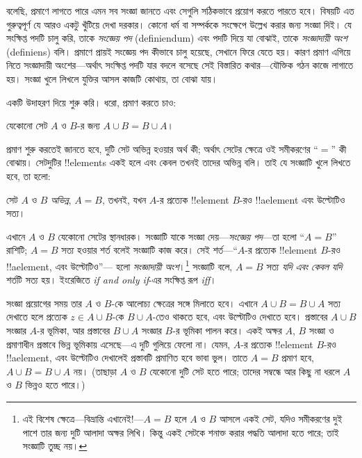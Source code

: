 \documentclass[../../../include/open-logic-section]{subfiles}
\begin{document}


বলেছি, প্রমাণে লাগতে পারে এমন সব সংজ্ঞা জানতে এবং সেগুলি
সঠিকভাবে প্রয়োগ করতে পারতে হবে। বিষয়টি এত গুরুত্বপূর্ণ যে
আরও একটু খুঁটিয়ে দেখা দরকার। কোনো ধর্ম বা সম্পর্ককে সংক্ষেপে
উল্লেখ করার জন্য সংজ্ঞা দিই। যে সংক্ষিপ্ত পদটি চালু করি,
তাকে \emph{সংজ্ঞেয় পদ} (definiendum) এবং পদটি দিয়ে যা বোঝাই,
তাকে \emph{সংজ্ঞাদায়ী অংশ} (definiens) বলি। প্রমাণে প্রায়ই
সংজ্ঞেয় পদ কীভাবে চালু হয়েছে, সেখানে ফিরে যেতে হয়। কারণ
প্রমাণ এগিয়ে নিতে সংজ্ঞাদায়ী অংশের—অর্থাৎ সংক্ষিপ্ত পদটি
যার বদলে বসেছে সেই বিস্তারিত কথার—যৌক্তিক গঠন কাজে
লাগাতে হয়। সংজ্ঞা খুলে লিখলে যুক্তির আসল কাজটি কোথায়,
তা বোঝা যায়।

একটি উদাহরণ দিয়ে শুরু করি। ধরো, প্রমাণ করতে চাও:

\begin{prop}
যেকোনো সেট $A$ ও $B$-র জন্য $A \cup B = B \cup A$।
\end{prop}

প্রমাণ শুরু করতেই জানতে হবে, দুটি সেট অভিন্ন হওয়ার অর্থ
কী; অর্থাৎ সেটের ক্ষেত্রে ওই সমীকরণের ``$=$'' কী বোঝায়।
সেটদুটির !!{element}s একই হলে এবং কেবল তখনই তাদের অভিন্ন
বলি। তাই যে সংজ্ঞাটি খুলে লিখতে হবে, তা হলো:

\begin{defn}
সেট $A$ ও $B$ \emph{অভিন্ন}, $A = B$, তখনই, যখন
$A$-র প্রত্যেক !!{element} $B$-রও !!a{element}
এবং উল্টোটিও সত্য।
\end{defn}

এখানে $A$ ও $B$ যেকোনো সেটের স্থানধারক। সংজ্ঞাটি
যাকে সংজ্ঞা দেয়—\emph{সংজ্ঞেয় পদ}—তা হলো
``$A = B$'' রাশিটি; $A = B$ সত্য হওয়ার শর্ত বলেই
সংজ্ঞাটি কাজ করে। সেই শর্ত—``$A$-র প্রত্যেক
!!{element} $B$-রও !!a{element}, এবং উল্টোটিও''—
হলো \emph{সংজ্ঞাদায়ী অংশ}।\footnote{এই বিশেষ
ক্ষেত্রে—বিভ্রান্তি এখানেই!—$A = B$ হলে $A$ ও $B$
আসলে একই সেট, যদিও সমীকরণের দুই পাশে তার জন্য
দুটি আলাদা অক্ষর লিখি। কিন্তু একই সেটকে শনাক্ত করার
পদ্ধতি আলাদা হতে পারে; তাই সংজ্ঞাটি তুচ্ছ নয়।}
সংজ্ঞাটি বলে, $A = B$ সত্য \emph{যদি এবং কেবল যদি}
শর্তটি সত্য হয়। ইংরেজিতে \emph{if and only if}-এর সংক্ষিপ্ত রূপ \emph{iff}।

সংজ্ঞা প্রয়োগের সময় তার $A$ ও $B$-কে আলোচ্য
ক্ষেত্রের সঙ্গে মিলাতে হবে। এখানে $A \cup B = B \cup A$
সত্য দেখাতে হলে প্রত্যেক $z \in A \cup B$-কে
$B \cup A$-তেও থাকতে হবে, এবং উল্টোটিও দেখাতে
হবে। প্রস্তাবের $A \cup B$ সংজ্ঞার $A$-র ভূমিকা,
আর প্রস্তাবের $B \cup A$ সংজ্ঞার $B$-র ভূমিকা পালন
করে। একই অক্ষর $A$, $B$ সংজ্ঞা ও প্রমাণাধীন
প্রস্তাবে ভিন্ন ভূমিকায় এসেছে—এ দুটি গুলিয়ে ফেলো না।
যেমন, $A$-র প্রত্যেক !!{element} $B$-রও
!!a{element}, এবং উল্টোটিও দেখালেই প্রস্তাবটি
প্রমাণিত হবে ভাবা ভুল। তাতে $A = B$ প্রমাণ হবে,
$A \cup B = B \cup A$ নয়। (তাছাড়া $A$ ও $B$
যেকোনো দুটি সেট হতে পারে; তাদের সম্বন্ধে আর কিছু
না ধরলে $A$ ও $B$ ভিন্নও হতে পারে।)
\end{document}
